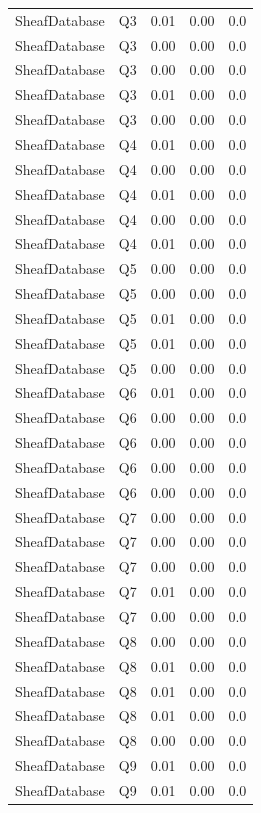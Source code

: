 \begin{table}[htbp]
\begin{tabular}{lrrrr}
SheafDatabase & Q3 & 0.01 & 0.00 & 0.0 \\
SheafDatabase & Q3 & 0.00 & 0.00 & 0.0 \\
SheafDatabase & Q3 & 0.00 & 0.00 & 0.0 \\
SheafDatabase & Q3 & 0.01 & 0.00 & 0.0 \\
SheafDatabase & Q3 & 0.00 & 0.00 & 0.0 \\
SheafDatabase & Q4 & 0.01 & 0.00 & 0.0 \\
SheafDatabase & Q4 & 0.00 & 0.00 & 0.0 \\
SheafDatabase & Q4 & 0.01 & 0.00 & 0.0 \\
SheafDatabase & Q4 & 0.00 & 0.00 & 0.0 \\
SheafDatabase & Q4 & 0.01 & 0.00 & 0.0 \\
SheafDatabase & Q5 & 0.00 & 0.00 & 0.0 \\
SheafDatabase & Q5 & 0.00 & 0.00 & 0.0 \\
SheafDatabase & Q5 & 0.01 & 0.00 & 0.0 \\
SheafDatabase & Q5 & 0.01 & 0.00 & 0.0 \\
SheafDatabase & Q5 & 0.00 & 0.00 & 0.0 \\
SheafDatabase & Q6 & 0.01 & 0.00 & 0.0 \\
SheafDatabase & Q6 & 0.00 & 0.00 & 0.0 \\
SheafDatabase & Q6 & 0.00 & 0.00 & 0.0 \\
SheafDatabase & Q6 & 0.00 & 0.00 & 0.0 \\
SheafDatabase & Q6 & 0.00 & 0.00 & 0.0 \\
SheafDatabase & Q7 & 0.00 & 0.00 & 0.0 \\
SheafDatabase & Q7 & 0.00 & 0.00 & 0.0 \\
SheafDatabase & Q7 & 0.00 & 0.00 & 0.0 \\
SheafDatabase & Q7 & 0.01 & 0.00 & 0.0 \\
SheafDatabase & Q7 & 0.00 & 0.00 & 0.0 \\
SheafDatabase & Q8 & 0.00 & 0.00 & 0.0 \\
SheafDatabase & Q8 & 0.01 & 0.00 & 0.0 \\
SheafDatabase & Q8 & 0.01 & 0.00 & 0.0 \\
SheafDatabase & Q8 & 0.01 & 0.00 & 0.0 \\
SheafDatabase & Q8 & 0.00 & 0.00 & 0.0 \\
SheafDatabase & Q9 & 0.01 & 0.00 & 0.0 \\
SheafDatabase & Q9 & 0.01 & 0.00 & 0.0 \\

\end{tabular}
\end{table}
